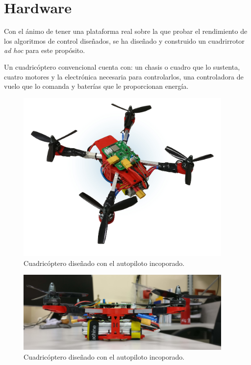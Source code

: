 \chapter{Hardware}

Con el ánimo de tener una plataforma real sobre la que probar el rendimiento de los algoritmos de control diseñados, se ha diseñado y construido un cuadrirrotor \textit{ad hoc} para este propósito.




Un cuadricóptero convencional cuenta con: un chasis o cuadro que lo sustenta, cuatro motores y la electrónica necesaria para controlarlos, una controladora de vuelo que lo comanda y baterías que le proporcionan energía.

\begin{figure}[htb!]
	\centering
	\includegraphics[width=0.95\textwidth]{hardware/droneImg}
	\caption{Cuadricóptero diseñado con el autopiloto incoporado. }
	\label{hardware:droneImg}
\end{figure}

\begin{figure}[htb!]
	\centering
	\includegraphics[width=0.95\textwidth]{hardware/Drones_side}
	\caption{Cuadricóptero diseñado con el autopiloto incoporado.}
	\label{hardware:droneImg}
\end{figure}


